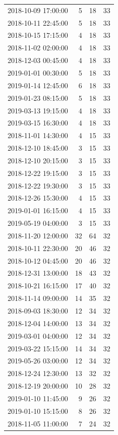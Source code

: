 \begin{tabular}{lrrr}
2018-10-09 17:00:00 & 5 & 18 & 33 \\
2018-10-11 22:45:00 & 5 & 18 & 33 \\
2018-10-15 17:15:00 & 4 & 18 & 33 \\
2018-11-02 02:00:00 & 4 & 18 & 33 \\
2018-12-03 00:45:00 & 4 & 18 & 33 \\
2019-01-01 00:30:00 & 5 & 18 & 33 \\
2019-01-14 12:45:00 & 6 & 18 & 33 \\
2019-01-23 08:15:00 & 5 & 18 & 33 \\
2019-03-13 19:15:00 & 4 & 18 & 33 \\
2019-03-15 16:30:00 & 4 & 18 & 33 \\
2018-11-01 14:30:00 & 4 & 15 & 33 \\
2018-12-10 18:45:00 & 3 & 15 & 33 \\
2018-12-10 20:15:00 & 3 & 15 & 33 \\
2018-12-22 19:15:00 & 3 & 15 & 33 \\
2018-12-22 19:30:00 & 3 & 15 & 33 \\
2018-12-26 15:30:00 & 4 & 15 & 33 \\
2019-01-01 16:15:00 & 4 & 15 & 33 \\
2019-05-19 04:00:00 & 3 & 15 & 33 \\
2018-11-20 12:00:00 & 32 & 64 & 32 \\
2018-10-11 22:30:00 & 20 & 46 & 32 \\
2018-10-12 04:45:00 & 20 & 46 & 32 \\
2018-12-31 13:00:00 & 18 & 43 & 32 \\
2018-10-21 16:15:00 & 17 & 40 & 32 \\
2018-11-14 09:00:00 & 14 & 35 & 32 \\
2018-09-03 18:30:00 & 12 & 34 & 32 \\
2018-12-04 14:00:00 & 13 & 34 & 32 \\
2019-03-01 04:00:00 & 12 & 34 & 32 \\
2019-03-22 15:15:00 & 14 & 34 & 32 \\
2019-05-26 03:00:00 & 12 & 34 & 32 \\
2018-12-24 12:30:00 & 13 & 32 & 32 \\
2018-12-19 20:00:00 & 10 & 28 & 32 \\
2019-01-10 11:45:00 & 9 & 26 & 32 \\
2019-01-10 15:15:00 & 8 & 26 & 32 \\
2018-11-05 11:00:00 & 7 & 24 & 32 \\

\end{tabular}

